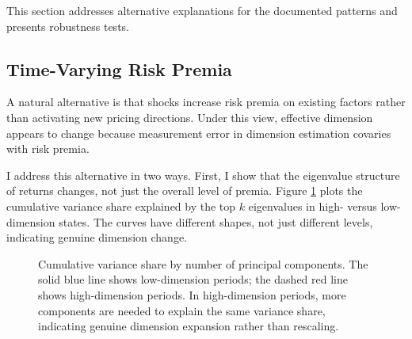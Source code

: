 \documentclass[12pt,letterpaper]{article}
\theoremstyle{plain}
\theoremstyle{definition}
\newcommand{\deff}{d_{\text{eff}}}
\begin{document}
This section addresses alternative explanations for the documented patterns and presents robustness tests.

\subsection{Time-Varying Risk Premia}\label{subsec:alt_riskpremia}

A natural alternative is that shocks increase risk premia on existing factors rather than activating new pricing directions. Under this view, effective dimension appears to change because measurement error in dimension estimation covaries with risk premia.

I address this alternative in two ways. First, I show that the eigenvalue structure of returns changes, not just the overall level of premia. Figure \ref{fig:eigenvalue_structure} plots the cumulative variance share explained by the top $k$ eigenvalues in high- versus low-dimension states. The curves have different shapes, not just different levels, indicating genuine dimension change.

\begin{figure}[htbp]
\centering
{}
\caption{Cumulative variance share by number of principal components. The solid blue line shows low-dimension periods; the dashed red line shows high-dimension periods. In high-dimension periods, more components are needed to explain the same variance share, indicating genuine dimension expansion rather than rescaling.}
\label{fig:eigenvalue_structure}
\end{figure}
\end{document}
